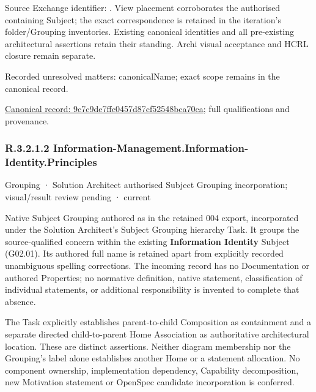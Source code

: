 Source Exchange identifier: \texttt{}. View placement corroborates
the authorised containing Subject; the exact correspondence is retained in the
iteration's folder/Grouping inventories. Existing canonical identities and all
pre-existing architectural assertions retain their standing. Archi visual
acceptance and HCRL closure remain separate.


{\small Recorded unresolved matters: canonicalName; exact scope remains in the canonical record.}\par
{\footnotesize \href{../../../../continuum/grouping/9c7c9de7ffc0457d87cf52548bca70ca.md}{Canonical record: 9c7c9de7ffc0457d87cf52548bca70ca}; full qualifications and provenance.}\par
\subsubsection*{R.3.2.1.2 Information-Management.Information-Identity.Principles}
\label{navigation:R.3.2.1.2}

\label{element:d931781bb22243fdb892937b88141cf4}
{\small Grouping · Solution Architect authorised Subject Grouping incorporation; visual/result review pending · current}\par

Native Subject Grouping authored as \texttt{} in the retained 004 export,
incorporated under the Solution Architect's Subject Grouping hierarchy Task.
It groups the source-qualified \texttt{} concern within
the existing \textbf{Information Identity} Subject (G02.01). Its authored full name
is retained apart from explicitly recorded unambiguous spelling corrections.
The incoming record has no Documentation or authored Properties; no normative
definition, native statement, classification of individual statements, or
additional responsibility is invented to complete that absence.



The Task explicitly establishes parent-to-child Composition as containment and
a separate directed child-to-parent Home Association as authoritative architectural
location. These are distinct assertions. Neither diagram membership nor the
Grouping's label alone establishes another Home or a statement allocation.
No component ownership, implementation dependency, Capability decomposition,
new Motivation statement or OpenSpec candidate incorporation is conferred.



